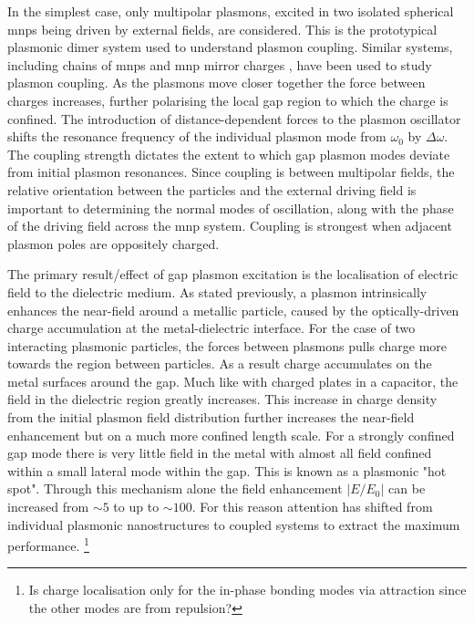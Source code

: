 \documentclass{article}
\begin{document}
In the simplest case, only multipolar plasmons, excited in two isolated spherical \glspl{mnp} being driven by external fields, are considered. This is the prototypical plasmonic dimer system used to understand plasmon coupling. Similar systems, including chains of \glspl{mnp} \cite{maier2002} and \gls{mnp} mirror charges \cite{mertens2013}, have been used to study plasmon coupling.
As the plasmons move closer together the force between charges increases, further polarising the local gap region to which the charge is confined. The introduction of distance-dependent forces to the plasmon oscillator shifts the resonance frequency of the individual plasmon mode from $\omega_0$ by $\Delta\omega$. The coupling strength dictates the extent to which gap plasmon modes deviate from initial plasmon resonances. Since coupling is between multipolar fields, the relative orientation between the particles and the external driving field is important to determining the normal modes of oscillation, along with the phase of the driving field across the \gls{mnp} system. Coupling is strongest when adjacent plasmon poles are oppositely charged.

The primary {\color{red}result/effect} of gap plasmon excitation is the localisation of electric field to the dielectric medium. As stated previously, a plasmon intrinsically enhances the near-field around a metallic particle, caused by {\color{red}the optically-driven} charge accumulation at the metal-dielectric interface. For the case of two interacting plasmonic particles, the forces between plasmons pulls charge more towards the region between particles. As a result charge accumulates on the metal surfaces around the gap.
Much like with charged plates in a capacitor, the field in the dielectric region greatly increases.
This increase in charge density from the initial plasmon field distribution further increases the near-field enhancement but on a much more confined length scale. For a strongly confined gap mode there is very little field in the metal with almost all field confined within a small lateral mode within the gap. This is known as a plasmonic "hot spot". Through this mechanism {\color{red}alone} the field enhancement $\left|E/E_0\right|$ can be increased from $\sim 5$ to up to $\sim 100$. For this reason attention has shifted from individual plasmonic nanostructures to coupled systems to extract the maximum performance.
\footnote{Is charge localisation only for the in-phase bonding modes via attraction since the other modes are from repulsion?}
\end{document}
